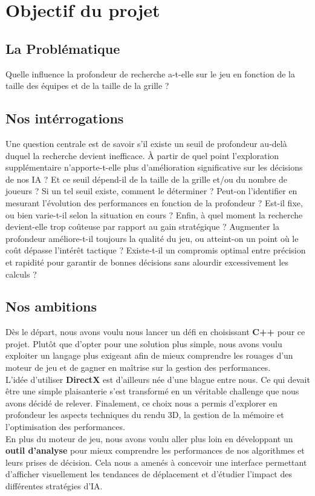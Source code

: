 \section{Objectif du projet}
\subsection{La Problématique}
Quelle influence la profondeur de recherche a-t-elle sur le jeu en fonction de la taille des équipes et de la taille de la grille ?

\subsection{Nos intérrogations}
Une question centrale est de savoir s’il existe un seuil de profondeur au-delà duquel la recherche devient inefficace. À partir de quel point l’exploration supplémentaire n’apporte-t-elle plus d’amélioration significative sur les décisions de nos IA ? Et ce seuil dépend-il de la taille de la grille et/ou du nombre de joueurs ?
Si un tel seuil existe, comment le déterminer ? Peut-on l’identifier en mesurant l’évolution des performances en fonction de la profondeur ? Est-il fixe, ou bien varie-t-il selon la situation en cours  ?
Enfin, à quel moment la recherche devient-elle trop coûteuse par rapport au gain stratégique ? Augmenter la profondeur améliore-t-il toujours la qualité du jeu, ou atteint-on un point où le coût dépasse l’intérêt tactique ? Existe-t-il un compromis optimal entre précision et rapidité pour garantir de bonnes décisions sans alourdir excessivement les calculs ?

\subsection{Nos ambitions}
Dès le départ, nous avons voulu nous lancer un défi en choisissant \textbf{C++} pour ce projet. Plutôt que d'opter pour une solution plus simple, nous avons voulu exploiter un langage plus exigeant afin de mieux comprendre les rouages d’un moteur de jeu et de gagner en maîtrise sur la gestion des performances. \\
L'idée d'utiliser \textbf{DirectX} est d’ailleurs née d’une blague entre nous. Ce qui devait être une simple plaisanterie s’est transformé en un véritable challenge que nous avons décidé de relever. Finalement, ce choix nous a permis d'explorer en profondeur les aspects techniques du rendu 3D, la gestion de la mémoire et l'optimisation des performances. \\
En plus du moteur de jeu, nous avons voulu aller plus loin en développant un \textbf{outil d’analyse} pour mieux comprendre les performances de nos algorithmes et leurs prises de décision. Cela nous a amenés à concevoir une interface permettant d'afficher visuellement les tendances de déplacement et d'étudier l’impact des différentes stratégies d’IA. \\
